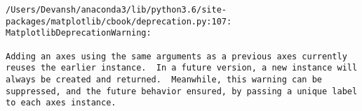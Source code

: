 \documentclass[11pt]{article}
\begin{document}
    \begin{Verbatim}[commandchars=\\\{\}]
/Users/Devansh/anaconda3/lib/python3.6/site-packages/matplotlib/cbook/deprecation.py:107: MatplotlibDeprecationWarning:

Adding an axes using the same arguments as a previous axes currently reuses the earlier instance.  In a future version, a new instance will always be created and returned.  Meanwhile, this warning can be suppressed, and the future behavior ensured, by passing a unique label to each axes instance.


    \end{Verbatim}

    \begin{center}
    \end{center}
    { \hspace*{\fill} \\}
    
    \begin{center}
    \end{center}
    { \hspace*{\fill} \\}
    
    \begin{center}
    \end{center}
    { \hspace*{\fill} \\}
    
    \begin{center}
    \end{center}
    { \hspace*{\fill} \\}
    
    \begin{center}
    \end{center}
    { \hspace*{\fill} \\}
    
    \begin{center}
    \end{center}
    { \hspace*{\fill} \\}
    
\end{document}
